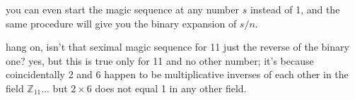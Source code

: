 \documentclass[../footnotes.tex]{subfiles}
\begin{document}
\myfootnote{} you can even start the magic sequence at any number $s$ instead of 1, and the same procedure will give you the binary expansion of $s/n$.

\myfootnote{} hang on, isn't that seximal magic sequence for 11 just the reverse of the binary one? yes, but this is true only for 11 and no other number; it's because coincidentally 2 and 6 happen to be multiplicative inverses of each other in the field $\mathbb{Z}_{11}$... but $2 \times 6$ does not equal 1 in any other field.
\end{document}
